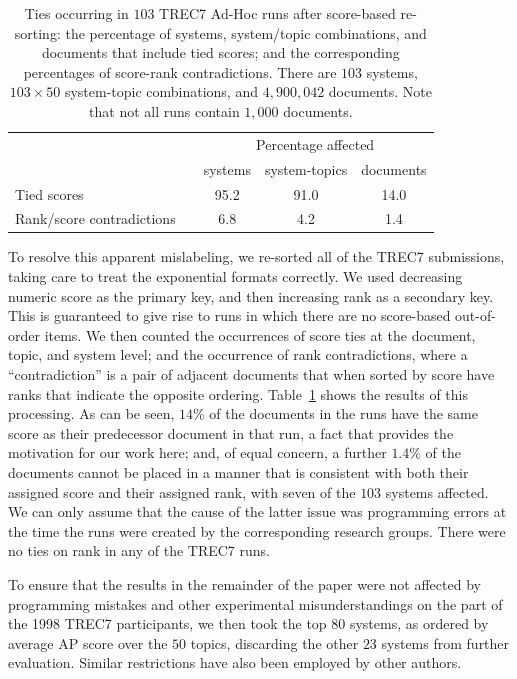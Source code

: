 \documentclass[runningheads,a4paper]{llncs}
\newcommand{\D}{\hphantom{0}}
\begin{document}
\begin{table}[t!]
\centering
\begin{tabular}{l c ccc}
\toprule
	&& \multicolumn{3}{c}{Percentage affected}
\\
\cmidrule{3-5}
	&& systems
		& system-topics
			& documents
\\
\midrule
Tied scores
	&& 95.2
		& 91.0
			& 14.0
\\
Rank/score contradictions
	&& \D6.8
		& \D4.2
			& \D1.4
\\
\bottomrule
\end{tabular}
 \renewcommand{\tabcolsep}{0.5em}
\caption{Ties occurring in $103$ TREC7 Ad-Hoc runs after score-based
re-sorting: the percentage of systems, system/topic combinations, and
documents that include tied scores; and the corresponding percentages
of score-rank contradictions.
There are $103$ systems, $103\times50$ system-topic
combinations, and $4{,}900{,}042$ documents.
Note that not all runs contain $1{,}000$ documents.
\label{tbl-trec7-ties}}
\end{table}

To resolve this apparent mislabeling, we re-sorted all of the TREC7
submissions, taking care to treat the exponential formats correctly.
We used decreasing numeric score as the primary key, and then
increasing rank as a secondary key.
This is guaranteed to give rise to runs in which there are no
score-based out-of-order items.
We then counted the occurrences of score ties at the document, topic,
and system level; and the occurrence of rank contradictions, where a
``contradiction'' is a pair of adjacent documents that when sorted by
score have ranks that indicate the opposite ordering.
Table~\ref{tbl-trec7-ties} shows the results of this processing.
As can be seen, $14$\% of the documents in the runs have the same
score as their predecessor document in that run, a fact that provides
the motivation for our work here; and, of equal concern, a further
$1.4$\% of the documents cannot be placed in a manner that is
consistent with both their assigned score and their assigned rank,
with seven of the $103$ systems affected.
We can only assume that the cause of the latter issue was programming
errors at the time the runs were created by the corresponding
research groups.
There were no ties on rank in any of the TREC7 runs.

To ensure that the results in the remainder of the paper were not
affected by programming mistakes and other experimental
misunderstandings on the part of the 1998 TREC7 participants, we then
took the top $80$ systems, as ordered by average AP score over the
$50$ topics, discarding the other $23$ systems from further
evaluation.
Similar restrictions have also been employed by other authors.
\end{document}
